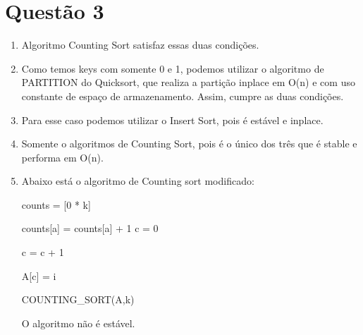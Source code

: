 \documentclass{article}
\begin{document}
\section*{Questão 3}
\begin{enumerate}[label=(\alph*)]
  \item Algoritmo Counting Sort satisfaz essas duas condições.
  \item Como temos keys com somente 0 e 1, podemos utilizar o algoritmo
  de PARTITION do Quicksort, que realiza a partição inplace em O(n)
  e com uso constante de espaço de armazenamento. Assim, cumpre as 
  duas condições.
  \item Para esse caso podemos utilizar o Insert Sort, pois é estável e inplace.
  \item Somente o algoritmos de Counting Sort, pois é o único dos três
  que é stable e performa em O(n).

  \item Abaixo está o algoritmo de Counting sort modificado:

\begin{algorithm}[H]
\SetAlgoLined
  counts = [0 * k]

   {
    counts[a] = counts[a] + 1
      }
    c = 0

   {
     {
      c = c + 1

      A[c] = i
      }
    }

\caption{COUNTING\_SORT(A,k)}
\end{algorithm}

O algoritmo não é estável.

\end{enumerate}
\end{document}

